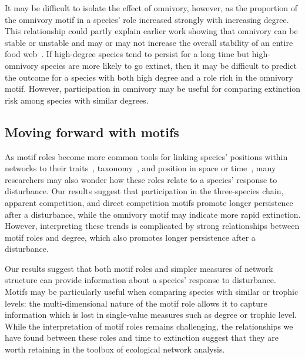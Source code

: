\documentclass[12pt]{article}
\begin{document}
\begin{spacing}{2.0}
        It may be difficult to isolate the effect of omnivory, however, as the proportion of the omnivory motif in a species' role increased strongly with increasing degree. 
        This relationship could partly explain earlier work showing that omnivory can be stable or unstable and may or may not increase the overall stability of an entire food web~\citep{McCann1997,Emmerson2004,Borrelli2015a,Monteiro2016}.
        If high-degree species tend to persist for a long time but high-omnivory species are more likely to go extinct, then it may be difficult to predict the outcome for a species with both high degree and a role rich in the omnivory motif.
        However, participation in omnivory may be useful for comparing extinction risk among species with similar degrees.


	\subsection*{Moving forward with motifs}	

        As motif roles become more common tools for linking species' positions within networks to their traits~\citep{Cirtwill2018EcolLett}, taxonomy~\citep{Stouffer2007}, and position in space or time~\citep{Baker2015}, many researchers may also wonder how these roles relate to a species' response to disturbance. 
        Our results suggest that participation in the three-species chain, apparent competition, and direct competition motifs promote longer persistence after a disturbance, while the omnivory motif may indicate more rapid extinction.
        However, interpreting these trends is complicated by strong relationships between motif roles and degree, which also promotes longer persistence after a disturbance.
        
        
        Our results suggest that both motif roles and simpler measures of network structure can provide information about a species' response to disturbance.
        Motifs may be particularly useful when comparing species with similar  or trophic levels: the multi-dimensional nature of the motif role allows it to capture information which is lost in single-value measures such as degree or trophic level.
        While the interpretation of motif roles remains challenging, the relationships we have found between these roles and time to extinction suggest that they are worth retaining in the toolbox of ecological network analysis.
        


\end{spacing}
\end{document}
